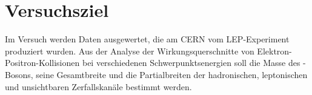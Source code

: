 \section{Versuchsziel}
Im Versuch werden Daten ausgewertet, die am CERN vom LEP-Experiment produziert wurden.
Aus der Analyse der Wirkungsquerschnitte von Elektron-Positron-Kollisionen
bei verschiedenen Schwerpunktsenergien soll
die Masse des \Z-Bosons, seine Gesamtbreite und die Partialbreiten der hadronischen,
leptonischen und unsichtbaren Zerfallskanäle bestimmt werden.